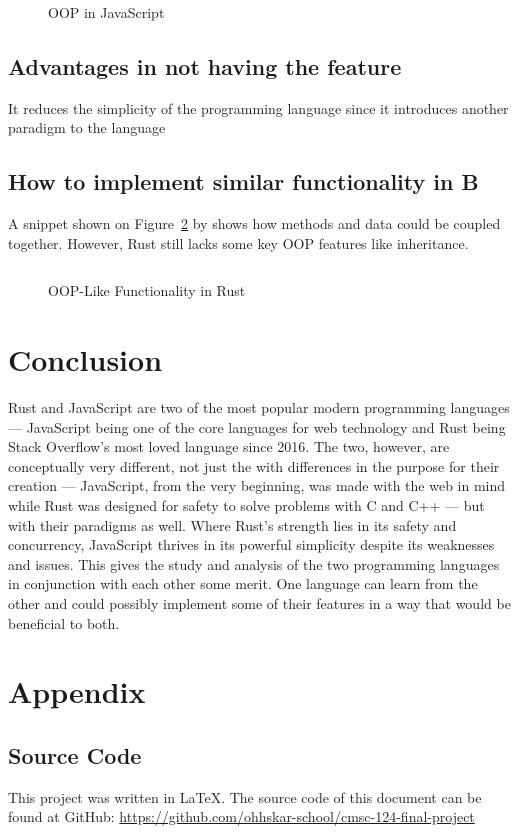 \documentclass{article}
\newcommand{\js}[1]{\inputminted{javascript}{samples/js/#1.js}}
\newcommand{\rust}[1]{\inputminted{rust}{samples/rust/#1.rs}}
\begin{document}
  \begin{figure}[ht]
    \js{oop}
    \caption{OOP in JavaScript}
    \label{fig:oop-2}
  \end{figure}

  \subsection{Advantages in not having the feature}
  It reduces the simplicity of the programming language since it introduces
  another paradigm to the language

  \subsection{How to implement similar functionality in B}
  A snippet shown on Figure~\ref{fig:objects} by \cite{klabnik_nichols_2018}
  shows how methods and data could be coupled together. However, Rust still
  lacks some key OOP features like inheritance.

  \begin{figure}[ht]
    \rust{objects}
    \caption{OOP-Like Functionality in Rust}
    \label{fig:objects}
  \end{figure}

  \section{Conclusion}
  Rust and JavaScript are two of the most popular modern programming languages
  --- JavaScript being one of the core languages for web technology and Rust
  being Stack Overflow’s most loved language since 2016. The two, however, are
  conceptually very different, not just the with differences in the purpose for
  their creation --- JavaScript, from the very beginning, was made with the web
  in mind while Rust was designed for safety to solve problems with C and C++
  --- but with their paradigms as well. Where Rust's strength lies in its safety
  and concurrency, JavaScript thrives in its powerful simplicity despite its
  weaknesses and issues. This gives the study and analysis of the two
  programming languages in conjunction with each other some merit. One language
  can learn from the other and could possibly implement some of their features
  in a way that would be beneficial to both.

  \newpage
  \nocite{*} \printbibliography[heading=bibintoc,title={References}]{}

  \newpage
  \section{Appendix}
  \subsection{Source Code}
  This project was written in \LaTeX{}. The source code of this document can be
  found at GitHub:
  \url{https://github.com/ohhskar-school/cmsc-124-final-project}
\end{document}
